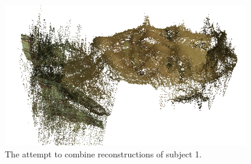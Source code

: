 \documentclass[journal]{IEEEtran}
\begin{document}
\begin{figure}
\centering
\includegraphics[width=\linewidth]{combined-faces}
\caption{The attempt to combine reconstructions of subject 1.}
\label{fig:combined-faces}
\end{figure}

\FloatBarrier


%
%



%
%
\end{document}
